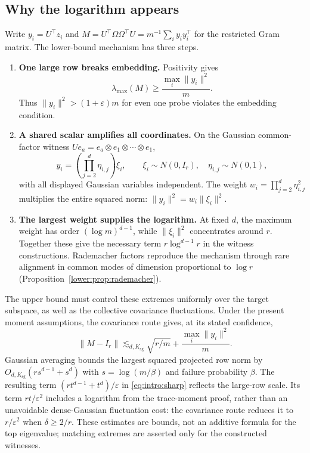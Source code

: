 \documentclass[11pt,a4paper]{article}
\theoremstyle{definition}\newtheorem{definition}[theorem]{Definition}
\theoremstyle{remark}\newtheorem{remark}[theorem]{Remark}
\numberwithin{equation}{section}
\newcommand{\Ksg}{{K_{\mathrm{sg}}}}\newcommand{\Cfour}{{C_4}}
\newcommand{\norm}[1]{\lVert#1\rVert}\newcommand{\ip}[2]{\langle#1,#2\rangle}
\begin{document}
\subsection{Why the logarithm appears}\label{sec:heuristics}
Write $y_i=U^\top z_i$ and
$M=U^\top\Omega\Omega^\top U=m^{-1}\sum_i y_i y_i^\top$ for the
restricted Gram matrix. The lower-bound mechanism has three steps.
\begin{enumerate}
\item \textbf{One large row breaks embedding.} Positivity gives
\[
 \lambda_{\max}(M)\ge\frac{\max_i\norm{y_i}^2}{m}.
\]
Thus $\norm{y_i}^2>(1+\varepsilon)m$ for even one probe violates
the embedding condition.

\item \textbf{A shared scalar amplifies all coordinates.}
On the Gaussian common-factor witness
$Ue_a=e_a\otimes e_1\otimes\cdots\otimes e_1$,
\[
 y_i=\left(\prod_{j=2}^d\eta_{i,j}\right)\xi_i,
 \qquad \xi_i\sim N(0,I_r),\quad \eta_{i,j}\sim N(0,1),
\]
with all displayed Gaussian variables independent. The weight
$w_i=\prod_{j=2}^d\eta_{i,j}^2$ multiplies the entire squared norm:
$\norm{y_i}^2=w_i\norm{\xi_i}^2$.

\item \textbf{The largest weight supplies the logarithm.}
At fixed $d$, the maximum weight has order $(\log m)^{d-1}$,
while $\norm{\xi_i}^2$ concentrates around $r$. Together these give
the necessary term $r\log^{d-1}r$ in the witness constructions.
Rademacher factors reproduce the mechanism through rare alignment
in common modes of dimension proportional to $\log r$
(Proposition~\ref{lower:prop:rademacher}).
\end{enumerate}

The upper bound must control these extremes uniformly over the target
subspace, as well as the collective covariance fluctuations. Under
the present moment assumptions, the covariance route gives, at its
stated confidence,
\[
 \norm{M-I_r}\lesssim_{d,\Ksg}
 \sqrt{r/m}+\frac{\max_i\norm{y_i}^2}{m}.
\]
Gaussian averaging bounds the largest squared projected row norm by
$O_{d,\Ksg}(rs^{d-1}+s^d)$ with $s=\log(m/\beta)$ and failure
probability $\beta$. The resulting term
$(rt^{d-1}+t^d)/\varepsilon$ in \eqref{eq:intro:sharp} reflects the
large-row scale. Its term $rt/\varepsilon^2$ includes a logarithm
from the trace-moment proof, rather than an unavoidable
dense-Gaussian fluctuation cost: the covariance route reduces it to
$r/\varepsilon^2$ when $\delta\ge2/r$. These estimates are bounds,
not an additive formula for the top eigenvalue; matching extremes
are asserted only for the constructed witnesses.
\end{document}
